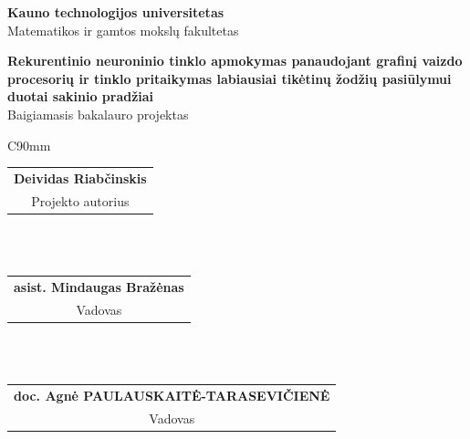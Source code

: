 

\begin{titlepage}
  \begin{center}


    \begin{figure}[H]
      \centering
    \end{figure}

    \vspace*{30pt}

    \fontXII
    \textbf{Kauno technologijos universitetas}\\
    Matematikos ir gamtos mokslų fakultetas

    \vspace*{100pt}

    \fontXVIII
	   \textbf{Rekurentinio neuroninio tinklo apmokymas panaudojant grafinį vaizdo procesorių ir tinklo pritaikymas labiausiai tikėtinų žodžių pasiūlymui duotai sakinio pradžiai}\\
     \fontXIV
     Baigiamasis bakalauro projektas

     \vspace*{76.8pt}

     \fontXII

     \singlespacing
     \begin{table}[H]
       \centering
      \begin{tabular}{C{90mm}}
      \hline
       \\
      \begin{tabular}{@{}c@{}}\textbf{Deividas Riabčinskis}\\Projekto autorius\end{tabular} \\
       \\
      \begin{tabular}{@{}c@{}}\textbf{asist. Mindaugas Bražėnas}\\Vadovas\end{tabular} \\
       \\
        \begin{tabular}{@{}c@{}}\textbf{doc. Agnė PAULAUSKAITĖ-TARASEVIČIENĖ}\\Vadovas\end{tabular} \\
       \\ \hline
      \end{tabular}
    \end{table}


\end{center}
\end{titlepage}
